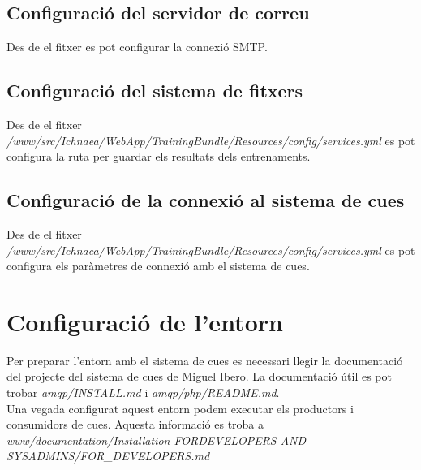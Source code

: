 \subsection{Configuració del servidor de correu}
Des de el fitxer  es pot configurar la connexió SMTP.

\subsection{Configuració del sistema de fitxers}
Des de el fitxer \textit{/www/src/Ichnaea/WebApp/TrainingBundle/Resources/config/services.yml} es pot configura la ruta per guardar els resultats dels entrenaments.

\subsection{Configuració de la connexió al sistema de cues}
Des de el fitxer \textit{/www/src/Ichnaea/WebApp/TrainingBundle/Resources/config/services.yml} es pot configura els paràmetres de connexió amb el sistema de cues.

\section{Configuració de l'entorn}
Per preparar l'entorn amb el sistema de cues es necessari llegir la documentació del projecte del sistema de cues de Miguel Ibero. La documentació útil es pot trobar \textit{amqp/INSTALL.md} i \textit{amqp/php/README.md}.\\

Una vegada configurat aquest entorn podem executar els productors i consumidors de cues. Aquesta informació es troba a \textit{www/documentation/Installation-FORDEVELOPERS-AND-SYSADMINS/FOR_DEVELOPERS.md}
